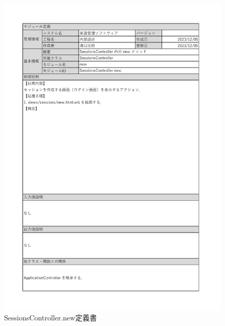 \begin{figure}
    \centering
    \includegraphics[scale=0.7]{img/Sessions/xlsx/SessionsController.new.pdf}
    \vspace{-1cm}
    \caption{SessionsController.new定義書}
\end{figure}
